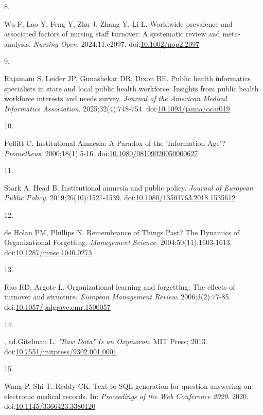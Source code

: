 \documentclass[
  american,
  11pt,
  letterpaper,
  oneside  ,captions=tableheading
]{scrartcl}
\newlength{\cslhangindent}
\newlength{\csllabelwidth}
\newenvironment{CSLReferences}[2] %
 {\begin{list}{}{%
  \setlength{\itemindent}{0pt}
  \setlength{\leftmargin}{0pt}
  \setlength{\parsep}{0pt}
  \ifodd #1
   \setlength{\leftmargin}{\cslhangindent}
   \setlength{\itemindent}{-1\cslhangindent}
  \fi
  \setlength{\itemsep}{#2\baselineskip}}}
 {\end{list}}
\newcommand{\CSLLeftMargin}[1]{\parbox[t]{\csllabelwidth}{\strut#1\strut}}
\newcommand{\CSLRightInline}[1]{\parbox[t]{\linewidth - \csllabelwidth}{\strut#1\strut}}
\begin{document}
\begin{CSLReferences}{0}{1}
\CSLLeftMargin{8. }%
\CSLRightInline{Wu F, Lao Y, Feng Y, Zhu J, Zhang Y, Li L. {Worldwide
prevalence and associated factors of nursing staff turnover: A
systematic review and meta-analysis}. \emph{Nursing Open}.
2024;11:e2097.
doi:\href{https://doi.org/10.1002/nop2.2097}{10.1002/nop2.2097}}

\CSLLeftMargin{9. }%
\CSLRightInline{Rajamani S, Leider JP, Gunashekar DR, Dixon BE. {Public
health informatics specialists in state and local public health
workforce: Insights from public health workforce interests and needs
survey}. \emph{Journal of the American Medical Informatics Association}.
2025;32(4):748-754.
doi:\href{https://doi.org/10.1093/jamia/ocaf019}{10.1093/jamia/ocaf019}}

\CSLLeftMargin{10. }%
\CSLRightInline{Pollitt C. {Institutional Amnesia: A Paradox of the
'Information Age'?} \emph{Prometheus}. 2000;18(1):5-16.
doi:\href{https://doi.org/10.1080/08109020050000627}{10.1080/08109020050000627}}

\CSLLeftMargin{11. }%
\CSLRightInline{Stark A, Head B. {Institutional amnesia and public
policy}. \emph{Journal of European Public Policy}.
2019;26(10):1521-1539.
doi:\href{https://doi.org/10.1080/13501763.2018.1535612}{10.1080/13501763.2018.1535612}}

\CSLLeftMargin{12. }%
\CSLRightInline{{de Holan PM, Phillips N}. {Remembrance of Things Past?
The Dynamics of Organizational Forgetting}. \emph{Management Science}.
2004;50(11):1603-1613.
doi:\href{https://doi.org/10.1287/mnsc.1040.0273}{10.1287/mnsc.1040.0273}}

\CSLLeftMargin{13. }%
\CSLRightInline{Rao RD, Argote L. Organizational learning and
forgetting: The effects of turnover and structure. \emph{European
Management Review}. 2006;3(2):77-85.
doi:\href{https://doi.org/10.1057/palgrave.emr.1500057}{10.1057/palgrave.emr.1500057}}

\CSLLeftMargin{14. }%
\CSLRightInline{, ed.Gitelman L. \emph{{"Raw Data" Is an Oxymoron}}. MIT
Press; 2013.
doi:\href{https://doi.org/10.7551/mitpress/9302.001.0001}{10.7551/mitpress/9302.001.0001}}

\CSLLeftMargin{15. }%
\CSLRightInline{Wang P, Shi T, Reddy CK. {Text-to-SQL generation for
question answering on electronic medical records}. In: \emph{Proceedings
of the Web Conference 2020}. 2020.
doi:\href{https://doi.org/10.1145/3366423.3380120}{10.1145/3366423.3380120}}


\end{CSLReferences}
\end{document}

